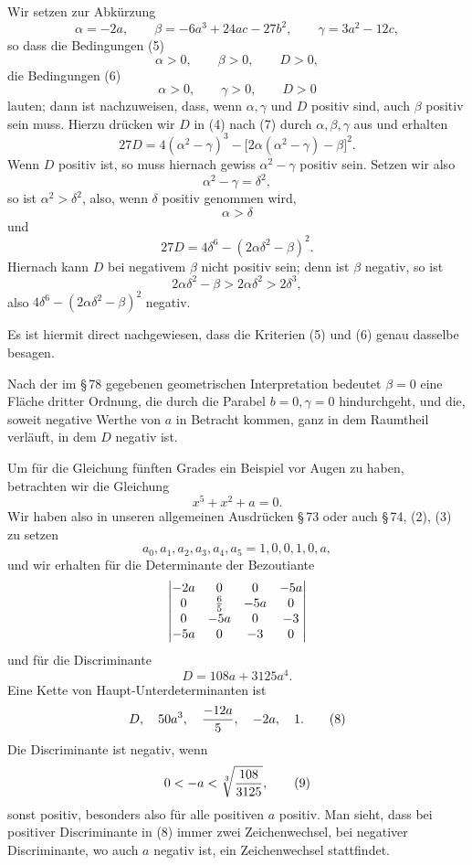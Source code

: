 \documentclass[11pt]{article}
\begin{document}
Wir setzen zur Abk\"urzung
\begin{equation}
        \alpha=-2a,
        \qquad
        \beta=-6a^3+24ac-27b^2,
        \qquad
        \gamma=3a^2-12c,
\tag{7}
\end{equation}
so dass die Bedingungen (5)
\[
        \alpha>0,
        \qquad \beta>0,
        \qquad D>0,
\]
die Bedingungen (6)
\[
        \alpha>0,
        \qquad \gamma>0,
        \qquad D>0
\]
lauten; dann ist nachzuweisen, dass, wenn $\alpha,\gamma$ und $D$ positiv sind, auch $\beta$ positiv sein muss. Hierzu dr\"ucken wir $D$ in (4) nach (7) durch $\alpha,\beta,\gamma$ aus und erhalten
\[
        27D=4(\alpha^2-\gamma)^3-\bigl[2\alpha(\alpha^2-\gamma)-\beta\bigr]^2.
\]
Wenn $D$ positiv ist, so muss hiernach gewiss $\alpha^2-\gamma$ positiv sein. Setzen wir also
\[
        \alpha^2-\gamma=\delta^2,
\]
so ist $\alpha^2>\delta^2$, also, wenn $\delta$ positiv genommen wird,
\[
        \alpha>\delta
\]
und
\[
        27D=4\delta^6-(2\alpha\delta^2-\beta)^2.
\]
Hiernach kann $D$ bei negativem $\beta$ nicht positiv sein; denn ist $\beta$ negativ, so ist
\[
        2\alpha\delta^2-\beta>2\alpha\delta^2>2\delta^3,
\]
also $4\delta^6-(2\alpha\delta^2-\beta)^2$ negativ.

Es ist hiermit direct nachgewiesen, dass die Kriterien (5) und (6) genau dasselbe besagen.

Nach der im \S\,78 gegebenen geometrischen Interpretation bedeutet $\beta=0$ eine Fl\"ache dritter Ordnung, die durch die Parabel $b=0,\gamma=0$ hindurchgeht, und die, soweit negative Werthe von $a$ in Betracht kommen, ganz in dem Raumtheil verl\"auft, in dem $D$ negativ ist.

Um f\"ur die Gleichung f\"unften Grades ein Beispiel vor Augen zu haben, betrachten wir die Gleichung
\[
        x^5+x^2+a=0.
\]
Wir haben also in unseren allgemeinen Ausdr\"ucken \S\,73 oder auch \S\,74, (2), (3) zu setzen
\[
        a_0,a_1,a_2,a_3,a_4,a_5=1,0,0,1,0,a,
\]
und wir erhalten f\"ur die Determinante der Bezoutiante
\[
\begin{vmatrix}
 -2a&0&0&-5a\cr
 0&\frac65&-5a&0\cr
 0&-5a&0&-3\cr
 -5a&0&-3&0
\end{vmatrix}
\]
und f\"ur die Discriminante
\[
        D=108a+3125a^4.
\]
Eine Kette von Haupt-Unterdeterminanten ist
\begin{equation}
        D,
        \quad 50a^3,
        \quad {-12a\over5},
        \quad -2a,
        \quad 1.
\tag{8}
\end{equation}
Die Discriminante ist negativ, wenn
\begin{equation}
        0<-a<\sqrt[3]{108\over3125},
\tag{9}
\end{equation}
sonst positiv, besonders also f\"ur alle positiven $a$ positiv. Man sieht, dass bei positiver Discriminante in (8) immer zwei Zeichenwechsel, bei negativer Discriminante, wo auch $a$ negativ ist, ein Zeichenwechsel stattfindet.
\end{document}
